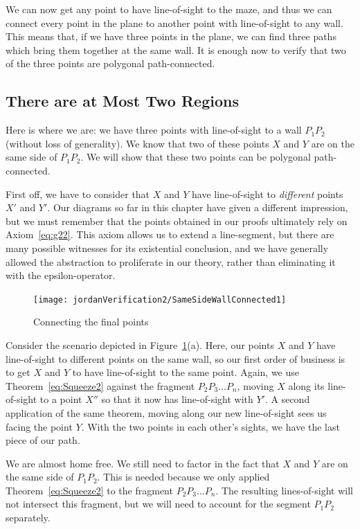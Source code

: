 We can now get any point to have line-of-sight to the maze, and thus we can connect every point in the plane to another point with line-of-sight to any wall. This means that, if we have three points in the plane, we can find three paths which bring them together at the same wall. It is enough now to verify that two of the three points are polygonal path-connected.

\subsection{There are at Most Two Regions}\label{sec:SameSideWallConnected}
Here is where we are: we have three points with line-of-sight to a wall $P_1P_2$ (without loss of generality). We know that two of these points $X$ and $Y$ are on the same side of $P_1P_2$. We will show that these two points can be polygonal path-connected.

First off, we have to consider that $X$ and $Y$ have line-of-sight to \emph{different} points $X'$ and $Y'$. Our diagrams so far in this chapter have given a different impression, but we must remember that the points obtained in our proofs ultimately rely on Axiom~\ref{eq:g22}. This axiom allows us to extend a line-segment, but there are many possible witnesses for its existential conclusion, and we have generally allowed the abstraction to proliferate in our theory, rather than eliminating it with the epsilon-operator. 

\begin{figure}
\centering\texttt{[image: jordanVerification2/SameSideWallConnected1]}
\caption{Connecting the final points}
\label{fig:SameSideWallConnected}
\end{figure}

Consider the scenario depicted in Figure~\ref{fig:SameSideWallConnected}(a). Here, our points $X$ and $Y$ have line-of-sight to different points on the same wall, so our first order of business is to get $X$ and $Y$ to have line-of-sight to the same point. Again, we use Theorem~\ref{eq:Squeeze2} against the fragment $P_2P_3\ldots P_n$, moving $X$ along its line-of-sight to a point $X''$ so that it now has line-of-sight with $Y'$. A second application of the same theorem, moving along our new line-of-sight sees us facing the point $Y$. With the two points in each other's sights, we have the last piece of our path.

We are almost home free. We still need to factor in the fact that $X$ and $Y$ are on the same side of $P_1P_2$. This is needed because we only applied Theorem~\ref{eq:Squeeze2} to the fragment $P_2P_3\ldots P_n$. The resulting lines-of-sight will not intersect this fragment, but we will need to account for the segment $P_1P_2$ separately.

